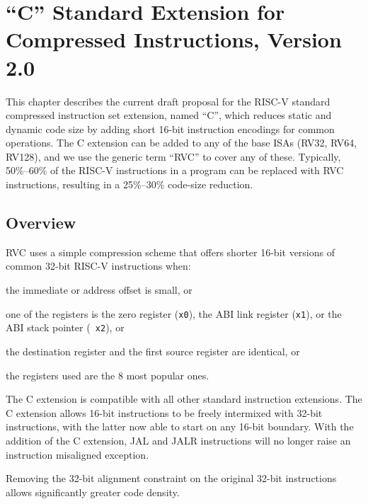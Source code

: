 \chapter{``C'' Standard Extension for Compressed Instructions, Version
2.0}
\label{compressed}

This chapter describes the current draft proposal for the RISC-V
standard compressed instruction set extension, named ``C'', which
reduces static and dynamic code size by adding short 16-bit
instruction encodings for common operations.  The C extension can be
added to any of the base ISAs (RV32, RV64, RV128), and we use the
generic term ``RVC'' to cover any of these.  Typically, 50\%--60\% of
the RISC-V instructions in a program can be replaced with RVC
instructions, resulting in a 25\%--30\% code-size reduction.

\section{Overview}

RVC uses a simple compression scheme that offers shorter 16-bit
versions of common 32-bit RISC-V instructions when:
\begin{tightlist}
	\item the immediate or address offset is small, or
	\item one of the registers is the zero register ({\tt x0}), the
      ABI link register ({\tt x1}), or the ABI stack pointer ({\tt
        x2}), or
	\item the destination register and the first source register are
      identical, or   
	\item the registers used are the 8 most popular ones. 
\end{tightlist}

The C extension is compatible with all other standard instruction
extensions.  The C extension allows 16-bit instructions to be freely
intermixed with 32-bit instructions, with the latter now able to start
on any 16-bit boundary.  With the addition of the C extension, JAL and
JALR instructions will no longer raise an instruction misaligned
exception.

\pagebreak

\begin{commentary}
Removing the 32-bit alignment constraint on the original 32-bit
instructions allows significantly greater code density.
\end{commentary}

